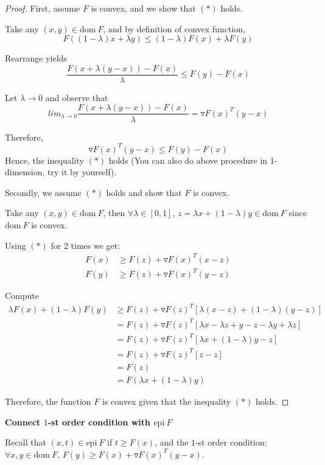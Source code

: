 \begin{proof}
First, assume $F$ is convex, and we show that $(*)$ holds. 

Take any $(x,y)\in \text{dom}\ F$, and by definition of convex function,
$$F((1-\lambda)x+\lambda y) \leq (1-\lambda)F(x) + \lambda F(y)$$

Rearrange yields
$$\frac{F(x+\lambda(y-x)) - F(x)}{\lambda} \leq F(y) - F(x)$$

Let $\lambda \rightarrow 0$ and observe that
$$lim_{\lambda\rightarrow 0} \frac{F(x+\lambda(y-x)) - F(x)}{\lambda} = \triangledown F(x)^T(y-x)$$

Therefore,
$$\triangledown F(x)^T(y-x)\leq F(y) - F(x)$$
Hence, the inequality $(*)$ holds (You can also do above procedure in 1-dimension, try it by yourself).


Secondly, we assume $(*)$ holds and show that $F$ is convex.

Take any $(x,y)\in \text{dom}\ F$, then $\forall \lambda\in[0,1]$, $z= \lambda x + (1-\lambda)y \in \text{dom}\ F$ since $\text{dom}\ F$ is convex.

Using $(*)$ for 2 times we get:
\begin{align*}
F(x) &\geq F(z) + \triangledown F(x)^T(x-z)\\
F(y) &\geq F(z) + \triangledown F(x)^T(y-z)
\end{align*} 

Compute
\begin{align*}
\lambda F(x)+(1-\lambda)F(y) &\geq F(z) + \triangledown F(z)^T[\lambda (x-z)+(1-\lambda)(y-z)]\\
&= F(z) + \triangledown F(z)^T[\lambda x - \lambda z + y - z - \lambda y +\lambda z]\\
&= F(z) + \triangledown F(z)^T[\lambda x + (1-\lambda)y - z]\\
&= F(z) + \triangledown F(z)^T[z - z]\\
&= F(z)\\
&= F(\lambda x + (1-\lambda )y)
\end{align*}

Therefore, the function $F$ is convex given that the inequality $(*)$ holds.
\end{proof}

\vspace{0.3cm}
\noindent\textbf{Connect $1$-st order condition with $\text{epi}\ F$}

Recall that $(x,t)\in \text{epi}\ F$ if $t\geq F(x)$, and the $1$-st order condition: $\forall x,y \in \text{dom}\ F$, $F(y)\geq F(x) + \triangledown F(x)^T(y-x)$.

